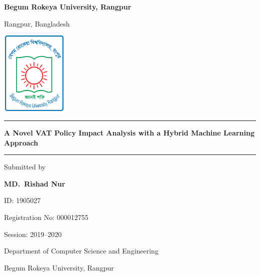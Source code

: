 \begin{titlepage}
    \centering
        
        {\LARGE\bfseries Begum Rokeya University, Rangpur\par}
        {\large Rangpur, Bangladesh\par}
        
        \vspace{1cm}
        
        \includegraphics[width=3.2cm,height=4cm]{images/BRUR_Logo.png}
        
        \vspace{1cm}
        
        \vspace{0.3cm}
        \rule{\textwidth}{0.5pt}

        \vspace{0.6cm}

        {\LARGE\bfseries A Novel VAT Policy Impact Analysis with a Hybrid Machine Learning Approach\par}

        \vspace{0.3cm}
        \rule{\textwidth}{0.4pt}

        \vspace{2cm}
        
        Submitted by\par
        \textbf{MD.\ Rishad Nur}\par
        ID: 1905027\par
        Registration No: 000012755\par
        Session: 2019--2020\par
        Department of Computer Science and Engineering\par
        Begum Rokeya University, Rangpur\par

        \vspace{1cm}


\end{titlepage}
